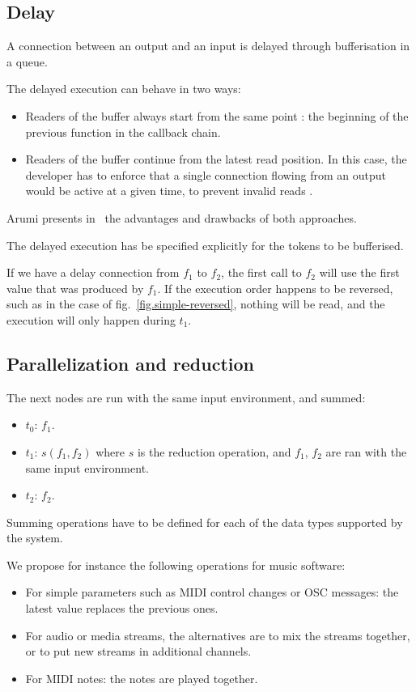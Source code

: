 \documentclass{article}
\begin{document}
\subsection{Delay}
A connection between an output and an input is delayed through bufferisation in a queue.
	
The delayed execution can behave in two ways:
\begin{itemize}
  \item Readers of the buffer always start from the same point : the beginning of the previous function in the callback chain.
  \item Readers of the buffer continue from the latest read position.
        In this case, the developer has to enforce that a single connection flowing from an output would be active at a given time, to prevent invalid reads .%
\end{itemize}

Arumi presents in~\cite{arumi2006dataflow} the advantages and drawbacks of both approaches.

The delayed execution has be specified explicitly for the tokens to be bufferised.
    
If we have a delay connection from $f_1$ to $f_2$, the first call to $f_2$ will use the first value that was produced by $f_1$.
If the execution order happens to be reversed, such as in the case of fig.~\ref{fig.simple-reversed}, nothing will be read, and the execution will only happen during $t_1$.
\subsection{Parallelization and reduction}
The next nodes are run with the same input environment, and summed:

\begin{itemize}
	\item $t_0$: $f_1$.
	\item $t_1$: $s(f_1, f_2)$ where $s$ is the reduction operation, and $f_1$, $f_2$ are ran with the same input environment.
	\item $t_2$: $f_2$. 
\end{itemize}

Summing operations have to be defined for each of the data types supported by the system.

We propose for instance the following operations for music software: 
\begin{itemize}
  \item For simple parameters such as MIDI control changes or OSC messages: the latest value replaces the previous ones.
  \item For audio or media streams, the alternatives are to mix the streams together, or to put new streams in additional channels.
  \item For MIDI notes: the notes are played together.
\end{itemize}
\end{document}
